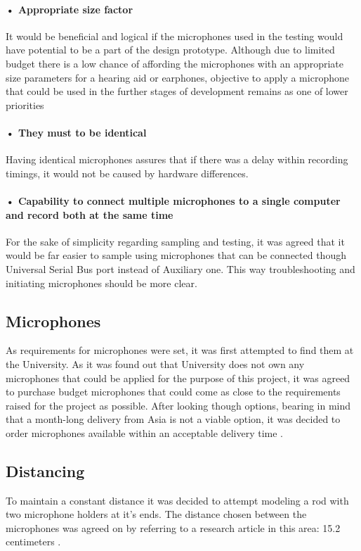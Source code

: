 \paragraph{• Appropriate size factor\\}    
It would be beneficial and logical if the microphones used in the testing would have potential to be a part of the design prototype. Although due to limited budget there is a low chance of affording the microphones with an appropriate size parameters for a hearing aid or earphones, objective to apply a microphone that could be used in the further stages of development remains as one of lower priorities    
\paragraph{• They must to be identical\\}    
Having identical microphones assures that if there was a delay within recording timings, it would not be caused by hardware differences.
\paragraph{• Capability to connect multiple microphones to a single computer and record both at the same time\\}   
For the sake of simplicity regarding sampling and testing, it was agreed that it would be far easier to sample using microphones that can be connected though Universal Serial Bus port instead of Auxiliary one. This way troubleshooting and initiating microphones should be more clear. 

\subsection{Microphones}
As requirements for microphones were set, it was first attempted to find them at the University. As it was found out that University does not own any microphones that could be applied for the purpose of this project, it was agreed to purchase budget microphones that could come as close to the requirements raised for the project as possible. After looking though options, bearing in mind that a month-long delivery from Asia is not a viable option, it was decided to order microphones available within an acceptable delivery time .\\

\subsection{Distancing}
To maintain a constant distance it was decided to attempt modeling a rod with two microphone holders at it's ends. The distance chosen between the microphones was agreed on by referring to a research article in this area: 15.2 centimeters . 
